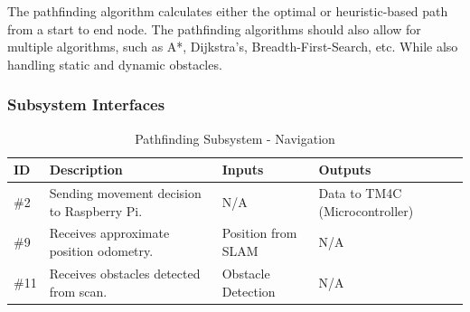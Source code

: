 The pathfinding algorithm calculates either the optimal or heuristic-based path from a start to end node. The pathfinding algorithms should also allow for multiple algorithms, such as A*, Dijkstra's, Breadth-First-Search, etc. While also handling static and dynamic obstacles.
\subsubsection{Subsystem Interfaces}

\begin{table}[H]
\caption{Pathfinding Subsystem - Navigation} 
\begin{center}
    \begin{tabular}{ | p{1.8cm} | p{8cm} | p{2cm} | p{3cm} |}
    \hline
    ID & Description & Inputs & Outputs  \\ \hline
    \#2 & Sending movement decision to Raspberry Pi. & N/A & Data to TM4C (Microcontroller) \\ \hline
    \#9 & Receives approximate position odometry. & Position from SLAM & N/A \\ \hline
    \#11 & Receives obstacles detected from scan. & Obstacle Detection & N/A \\ \hline
    \end{tabular}
\end{center}
\end{table}

\newpage


